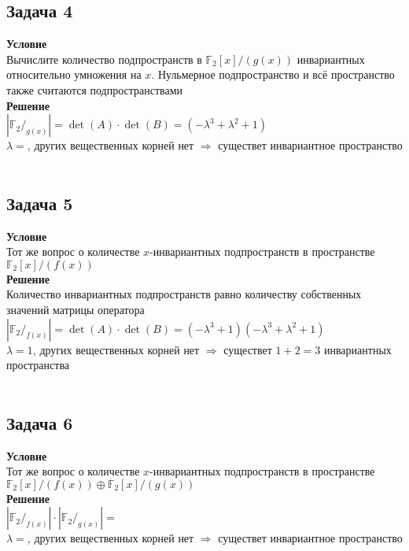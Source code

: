 		
		\subsection*{\textbf{Задача 4}}
		\textbf{Условие}\\
		Вычислите количество подпространств в $\mathbb{F}_2[x]\slash(g(x))$ инвариантных относительно умножения на $x$. Нульмерное подпространство и всё пространство также считаются подпространствами\\
		\textbf{Решение}\\
		$|\mathbb{F}_2\slash_{g(x)}| = \det(A) \cdot \det(B) = (-\lambda^3 + \lambda^2 + 1)$\\
		$\lambda = $, других вещественных корней нет $\Rightarrow$ существет  инвариантное пространство\\
		\\
		
		\subsection*{\textbf{Задача 5}}
		\textbf{Условие}\\
		Тот же вопрос о количестве $x$-инвариантных подпространств в пространстве $\mathbb{F}_2[x]/(f(x))$\\
		\textbf{Решение}\\
		Количество инвариантных подпространств равно количеству собственных значений матрицы оператора\\
		$|\mathbb{F}_2\slash_{f(x)}| = \det(A) \cdot \det(B) = (-\lambda^3 + 1)(-\lambda^3 + \lambda^2 + 1)$\\
		$\lambda = 1$, других вещественных корней нет $\Rightarrow$ существет $1+2 = 3$ инвариантных пространства\\
		\\
		
		\subsection*{\textbf{Задача 6}}
		\textbf{Условие}\\
		Тот же вопрос о количестве $x$-инвариантных подпространств в пространстве $\mathbb{F}_2[x]/(f(x)) \oplus \mathbb{F}_2[x]/(g(x))$\\
		\textbf{Решение}\\
		$|\mathbb{F}_2\slash_{f(x)}| \cdot |\mathbb{F}_2\slash_{g(x)}| = $\\
		$\lambda = $, других вещественных корней нет $\Rightarrow$ существет  инвариантное пространство\\
		\\